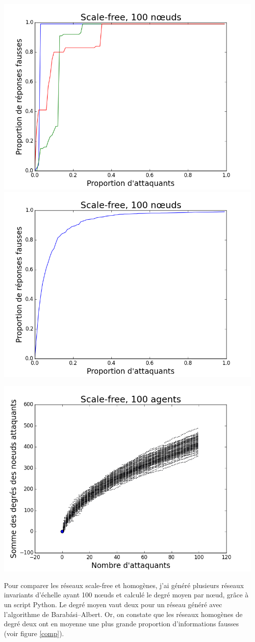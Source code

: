\documentclass[12pt,a4paper]{article}
\begin{document}
\begin{center}
\includegraphics[width=0.49\linewidth]{../resultats/scale-free/sf-t1s-n100-2-it3.png}
\includegraphics[width=0.49\linewidth]{../resultats/scale-free/sf-t1-n100-1-it100.png}
 \label{sf}
\end{center}

\begin{center}
\includegraphics[width=0.49\linewidth]{../resultats/scale-free/sf-t2-n-100-1-it100.png}
 \label{deg}
\end{center}

Pour comparer les réseaux scale-free et homogènes, j'ai généré plusieurs réseaux invariants d'échelle ayant 100 nœuds et calculé le degré moyen par nœud, grâce à un script Python.
Le degré moyen vaut deux pour un réseau généré avec l'algorithme de Barabási–Albert.
Or, on constate que les réseaux homogènes de degré deux ont en moyenne une plus grande proportion d'informations fausses (voir figure \ref{comp}).
\end{document}
